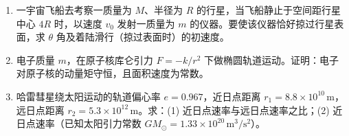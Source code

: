 \documentclass[12pt]{article}
\begin{document}
\begin{enumerate}[label=\textbf{例\arabic*.}, leftmargin=*]
\item 一宇宙飞船去考察一质量为 $M$、半径为 $R$ 的行星，当飞船静止于空间距行星中心 $4R$ 时，以速度 $v_0$ 发射一质量为 $m$ 的仪器。要使该仪器恰好掠过行星表面，求 $\theta$ 角及着陆滑行（掠过表面时）的初速度。

\item 电子质量 $m$，在原子核库仑引力 $F = -k/r^2$ 下做椭圆轨道运动。证明：电子对原子核的动量矩守恒，且面积速度为常数。

\item 哈雷彗星绕太阳运动的轨道偏心率 $e = 0.967$，近日点距离 $r_1 = 8.8 \times 10^{10}\,\mathrm{m}$，远日点距离 $r_2 = 5.3 \times 10^{12}\,\mathrm{m}$。求：(1) 近日点速率与远日点速率之比；(2) 近日点速率（已知太阳引力常数 $GM_\odot = 1.33\times 10^{20}\,\mathrm{m^3/s^2}$）。

\end{enumerate}
\end{document}
